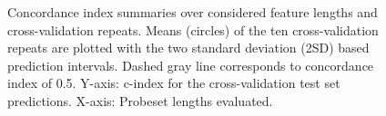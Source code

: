 \documentclass[letterpaper,12pt]{article}
\begin{document}
\begin{figure}[!th]
\centering

\caption{Concordance index summaries over considered feature lengths and cross-validation repeats. Means (circles) of the ten cross-validation repeats are plotted with the two standard deviation (2SD) based prediction intervals. Dashed gray line corresponds to concordance index of 0.5. Y-axis: c-index for the cross-validation test set predictions. X-axis: Probeset lengths evaluated.}
\label{Fig:PLSCoxCindex}
\end{figure}
\end{document}
